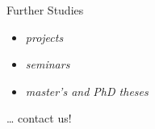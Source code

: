 \begin{frame}[label=Exam]{\myframetitle}
\begin{fancycolumns}
		\begin{note}{Further Studies}
			\begin{itemize}
				\item \emph{projects}
				\item \emph{seminars}
				\item \emph{master's and PhD theses}
			\end{itemize}
			\ldots{} contact us!
		\end{note}
	\end{fancycolumns}
\end{frame}
